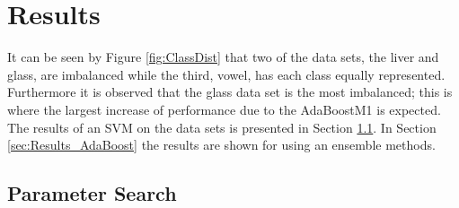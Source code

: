 \section{Results}
\label{sec:Results}

It can be seen by Figure \ref{fig:ClassDist} that two of the data sets, the  liver and glass, are imbalanced while the third, vowel, has each class equally represented.
Furthermore it is observed that the glass data set is the most imbalanced; this is where the largest increase of performance due to the AdaBoostM1 is expected.
The results of an SVM on the data sets is presented in Section \ref{sec:Results_ParamSearch}.
In Section \ref{sec:Results_AdaBoost} the results are shown for using an ensemble methods.

\subsection{Parameter Search}
\label{sec:Results_ParamSearch}

